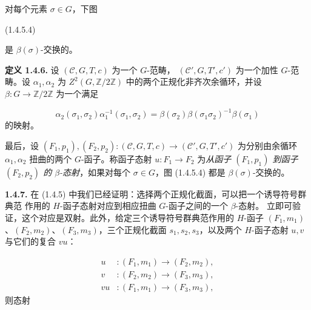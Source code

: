 \clearpage
{}%
对每个元素 $\sigma\in G$，下图

\begin{center}
  \hfill\textup{(1.4.5.4)}
\end{center}
是 $\beta(\sigma)$-交换的。

\noindent\textbf{定义 1.4.6.}\quad
设 $(\mathcal C,G,T,c)$ 为一个 $G$-范畴，
$(\mathcal C',G,T',c')$ 为一个加性 $G$-范畴。设 $\alpha_1,\alpha_2$ 为
$Z^2(G,\mathbb Z/2\mathbb Z)$ 中的两个正规化非齐次余循环，并设
$\beta\colon G\to\mathbb Z/2\mathbb Z$ 为一个满足

\begin{equation}
  \alpha_2(\sigma_1,\sigma_2)\alpha_1^{-1}(\sigma_1,\sigma_2)
  =\beta(\sigma_2)\beta(\sigma_1\sigma_2)^{-1}\beta(\sigma_1)
  \tag{1.4.6.1}
\end{equation}
的映射。

最后，设
$(F_1,p_1),(F_2,p_2)\colon(\mathcal C,G,T,c)
\to(\mathcal C',G,T',c')$
为分别由余循环 $\alpha_1,\alpha_2$ 扭曲的两个 $G$-函子。称函子态射
$u\colon F_1\to F_2$ 为\emph{从函子 $(F_1,p_1)$ 到函子 $(F_2,p_2)$ 的
$\beta$-态射}，如果对每个 $\sigma\in G$，图 (1.4.5.4) 都是
$\beta(\sigma)$-交换的。

\noindent\textbf{1.4.7.}\quad
在 (1.4.5) 中我们已经证明：选择两个正规化截面，可以把一个诱导符号群典范
作用的 $H$-函子态射对应到相应扭曲 $G$-函子之间的一个 $\beta$-态射。
立即可验证，这个对应是双射。此外，给定三个诱导符号群典范作用的 $H$-函子
$(F_1,m_1)$、$(F_2,m_2)$、$(F_3,m_3)$，三个正规化截面
$s_1,s_2,s_3$，以及两个 $H$-函子态射 $u,v$ 与它们的复合 $vu$：

\begin{equation}
  \begin{aligned}
    u&\colon(F_1,m_1)\longrightarrow(F_2,m_2),\\
    v&\colon(F_2,m_2)\longrightarrow(F_3,m_3),\\
    vu&\colon(F_1,m_1)\longrightarrow(F_3,m_3),
  \end{aligned}
  \tag{1.4.7.1}
\end{equation}
则态射

